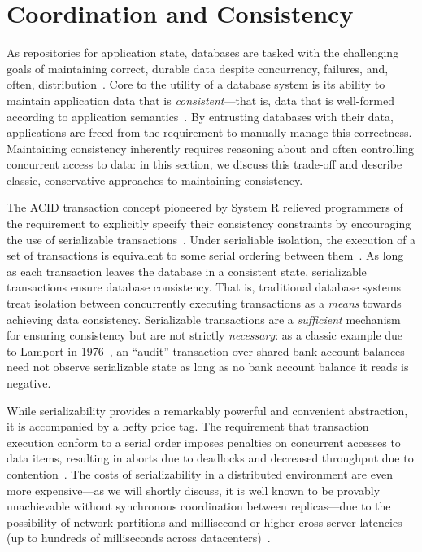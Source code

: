 
\section{Coordination and Consistency}
\label{sec:motivation}


As repositories for application state, databases are tasked with the
challenging goals of maintaining correct, durable data despite
concurrency, failures, and, often,
distribution~\cite{bernstein-book}. Core to the utility of a database
system is its ability to maintain application data that is
\textit{consistent}---that is, data that is well-formed according to
application semantics~\cite{gray-virtues}. By entrusting databases
with their data, applications are freed from the requirement to
manually manage this correctness. Maintaining consistency inherently
requires reasoning about and often controlling concurrent access to
data: in this section, we discuss this trade-off and describe classic,
conservative approaches to maintaining consistency.


 The ACID transaction concept
pioneered by System R relieved programmers of the requirement to
explicitly specify their consistency constraints by encouraging the
use of serializable transactions~\cite{gray-virtues}. Under
serialiable isolation, the execution of a set of transactions is
equivalent to some serial ordering between
them~\cite{bernstein-book}. As long as each transaction leaves the
database in a consistent state, serializable transactions ensure
database consistency. That is, traditional database systems treat
isolation between concurrently executing transactions as a
\textit{means} towards achieving data consistency. Serializable
transactions are a \textit{sufficient} mechanism for ensuring
consistency but are not strictly \textit{necessary}: as a classic
example due to Lamport in 1976~\cite{lamport-audit}, an ``audit''
transaction over shared bank account balances need not observe
serializable state as long as no bank account balance it reads is
negative.


While serializability provides a remarkably powerful and convenient
abstraction, it is accompanied by a hefty price tag. The requirement
that transaction execution conform to a serial order imposes penalties
on concurrent accesses to data items, resulting in aborts due to
deadlocks and decreased throughput due to
contention~\cite{bernstein-book,gray-book,gray-virtues}. The costs of
serializability in a distributed environment are even more
expensive---as we will shortly discuss, it is well known to be
provably unachievable without synchronous coordination between
replicas---due to the possibility of network partitions and
millisecond-or-higher cross-server latencies (up to hundreds of
milliseconds across datacenters)~\cite{hat-vldb,bobtail}.

